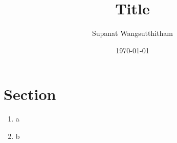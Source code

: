 \documentclass[a4paper,12pt]{article}
\title{Title}
\author{Supanat Wangsutthitham}
\date{\today}
\begin{document}
\section*{Section}

\begin{enumerate}
  \item a
  \item b
\end{enumerate}
\end{document}
